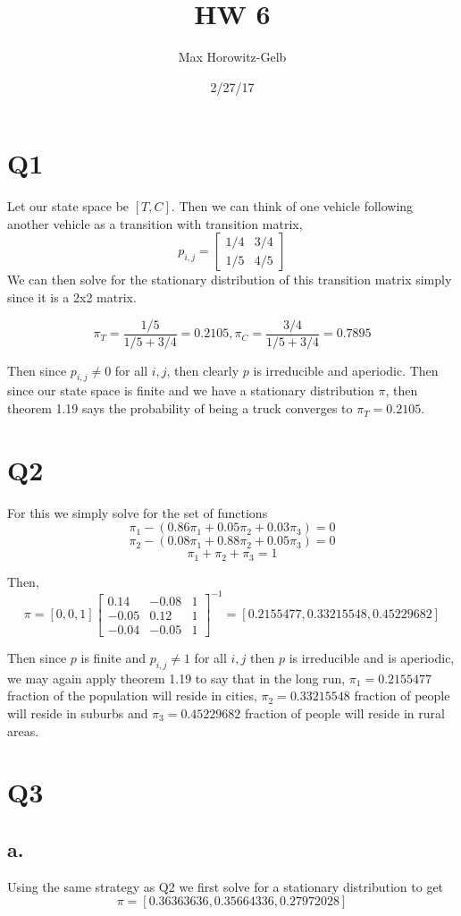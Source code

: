 \documentclass{article}
\title{HW 6}
\date{2/27/17}
\author{Max Horowitz-Gelb}
\begin{document}
\maketitle
\section*{Q1}
Let our state space be $[T,C]$. Then we can think of one vehicle following another vehicle as a transition 
with transition matrix,
\[
p_{i,j} =
\begin{bmatrix}
1/4 & 3/4\\
1/5 & 4/5
\end{bmatrix}
\]
We can then solve for the stationary distribution of this transition matrix simply since it is a 2x2 matrix.

\[
\pi_T = \frac{1/5}{1/5 + 3/4} = 0.2105, 
\pi_C = \frac{3/4}{1/5 + 3/4} = 0.7895
\]

Then since $p_{i,j} \neq 0$ for all $i,j$, then clearly $p$ is irreducible and aperiodic. Then since our state space is finite and we have a stationary distribution $\pi$, then theorem 1.19 says the probability of being a truck converges to $\pi_T = 0.2105$. 

\section*{Q2}
For this we simply solve for the set of functions
\[
\pi_1 - (0.86\pi_1 + 0.05\pi_2 + 0.03\pi_3) = 0
\]
\[
	\pi_2 - (0.08\pi_1 + 0.88\pi_2 + 0.05 \pi_3)= 0
\]
\[
	\pi_1 + \pi_2 + \pi_3 = 1
\]

Then,
\[
\pi = [0,0,1]\begin{bmatrix}
0.14 & -0.08 & 1 \\
-0.05 & 0.12 & 1\\
-0.04 & -0.05 & 1
\end{bmatrix}^{-1} 
 = [ 0.2155477 ,  0.33215548,  0.45229682]
\]

Then since $p$ is finite and $p_{i,j} \neq 1$ for all $i,j$ then $p$  is irreducible and is aperiodic, we may again apply theorem 1.19 to say that in the long run,
$\pi_1 = 0.2155477$ fraction of the population will reside in cities, $\pi_2 = 0.33215548$ fraction of people will reside in suburbs and $\pi_3 = 0.45229682$ fraction of people will reside in rural areas.

\section*{Q3}
\subsection*{a.}
Using the same strategy as Q2 we first solve for a stationary distribution to get
\[
\pi = [ 0.36363636,  0.35664336,  0.27972028]
\]
 
\end{document}
